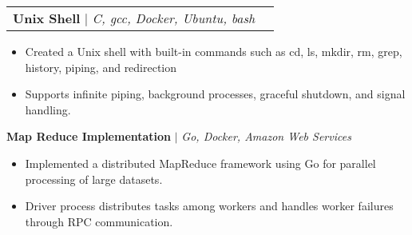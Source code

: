 \documentclass[letterpaper,11pt]{article}
\makeatletter
\newcommand{\resumeItem}[1]{
  \item\small{
    {#1 \vspace{-2pt}}
  }
}
\newcommand{\resumeProjectHeading}[2]{
    \item
    \begin{tabular*}{0.97\textwidth}{l@{\extracolsep{\fill}}r}
      \small#1 & #2 \\
    \end{tabular*}\vspace{-7pt}
}
\newcommand{\resumeItemListStart}{\begin{itemize}}
\newcommand{\resumeItemListEnd}{\end{itemize}\vspace{-5pt}}
\makeatother
\begin{document}

        \resumeProjectHeading
          {\textbf{Unix Shell} $|$ \emph{C, gcc, Docker, Ubuntu, bash}}{}
          \resumeItemListStart
          \resumeItem{Created a Unix shell with built-in commands such as cd, ls, mkdir, rm, grep, history, piping, and redirection}
          \resumeItem{Supports infinite piping, background processes, graceful shutdown, and signal handling.}
          \resumeItemListEnd


          {\textbf{Map Reduce Implementation} $|$ \emph{Go, Docker, Amazon Web Services}}{}
          \resumeItemListStart
          \vspace{-5pt}

          \resumeItem{Implemented a distributed MapReduce framework using Go for parallel processing of large datasets.}
          \resumeItem{Driver process distributes tasks among workers and handles worker failures through RPC communication.}
          \resumeItemListEnd
\end{document}
